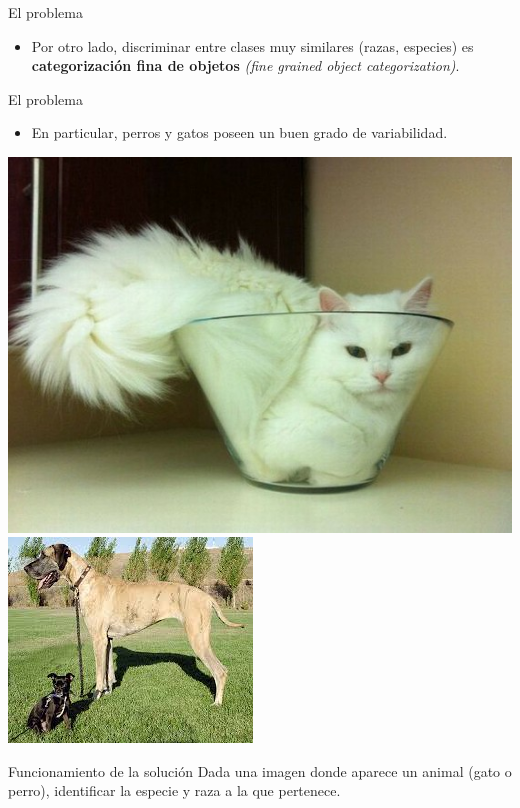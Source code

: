 \documentclass{beamer}
\begin{document}
\begin{frame}{El problema}
\begin{itemize}
\begin{center}
            \end{center}
            \pause
        \item Por otro lado, discriminar entre clases muy similares (razas,
            especies) es \textbf{categorización fina de objetos}
            \textit{(fine grained object categorization)}. 
    \end{itemize}
\end{frame}
\begin{frame}{El problema}
    \begin{itemize}
        \item En particular, perros y gatos poseen un buen
            grado de variabilidad.
    \end{itemize}
    \pause
    \begin{center}
        {\includegraphics[scale=0.2]{imagen/fitsisits.jpg}}
        {\includegraphics[scale=0.5]{imagen/dogdiff.jpg}}
    \end{center}
\end{frame}	

\begin{frame}{Funcionamiento de la solución}
    Dada una imagen donde aparece un animal (gato o perro), identificar la
    especie y raza a la que pertenece.
\end{frame}
\end{document}

